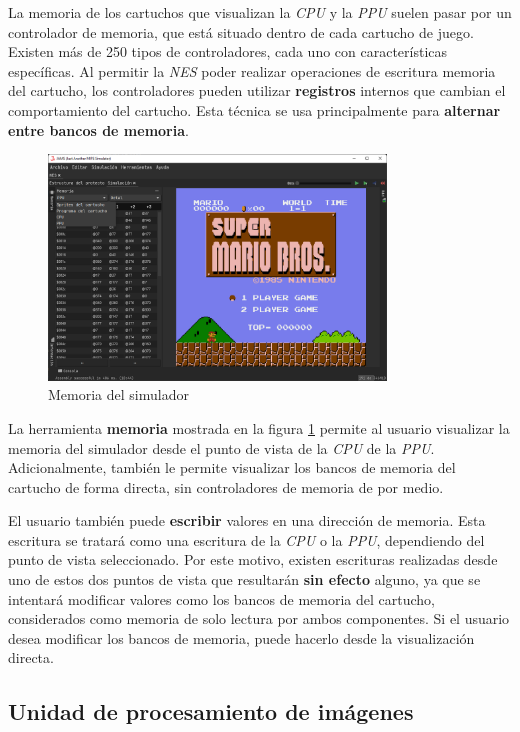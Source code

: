 La memoria de los cartuchos que visualizan la \textit{CPU}
y la \textit{PPU} suelen pasar por un controlador de memoria,
que está situado dentro de cada cartucho
de juego.
Existen más de 250 tipos de controladores, cada
uno con características específicas.
Al permitir la \textit{NES} poder realizar operaciones de
escritura  memoria del cartucho, los controladores
pueden utilizar \textbf{registros} internos que cambian
el comportamiento del cartucho.
Esta técnica se usa principalmente para \textbf{alternar
entre bancos de memoria}.

\begin{figure}[h]
    \centering
    \includegraphics[width=0.8\textwidth]{images/nes/nes-memory}
    \caption{Memoria del simulador}
    \label{fig:nes-memory}
\end{figure}

La herramienta \textbf{memoria} mostrada en la
figura \ref{fig:nes-memory} permite
al usuario visualizar la memoria del simulador desde
el punto de vista de la \textit{CPU} de la \textit{PPU}.
Adicionalmente, también le permite visualizar los bancos
de memoria del cartucho de forma directa, sin controladores
de memoria de por medio.

El usuario también puede \textbf{escribir} valores en una
dirección de memoria.
Esta escritura se tratará como una escritura de la \textit{CPU}
o la \textit{PPU}, dependiendo del punto de vista seleccionado.
Por este motivo, existen escrituras realizadas desde uno de estos
dos puntos de vista que resultarán \textbf{sin efecto} alguno,
ya que se intentará modificar valores como los bancos de memoria
del cartucho, considerados como memoria de solo
lectura por ambos componentes.
Si el usuario desea modificar los bancos de memoria, puede
hacerlo desde la visualización directa.

\subsection{Unidad de procesamiento de imágenes}\label{subsec:unidad-de-procesamiento-de-imagenes}

